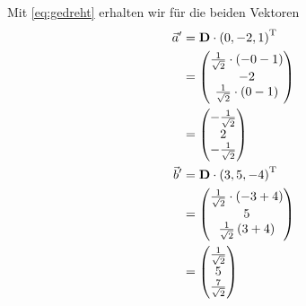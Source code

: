 Mit \eqref{eq:gedreht} erhalten wir für die beiden Vektoren
\begin{align*}
    \vec a' &= \mat D \cdot \del{0,-2,1}^\text{T} \\
            &= \begin{pmatrix}
    \frac{1}{\sqrt{2}}\cdot\del{-0 - 1} \\
    -2 \\
    \frac{1}{\sqrt{2}}\cdot\del{0 - 1}
    \end{pmatrix} \\
    &= \begin{pmatrix}
    -\frac1{\sqrt2} \\
    2 \\
    -\frac1{\sqrt2}
\end{pmatrix} \\
    \vec b' &= \mat D \cdot \del{3,5,-4}^\text{T} \\
            &= \begin{pmatrix}
    \frac1{\sqrt2}\cdot\del{-3+4} \\
        5 \\
        \frac1{\sqrt{2}}\del{3+4}
    \end{pmatrix} \\
    &= \begin{pmatrix}
    \frac1{\sqrt2} \\
    5 \\
    \frac7{\sqrt2}
\end{pmatrix}
\end{align*}


